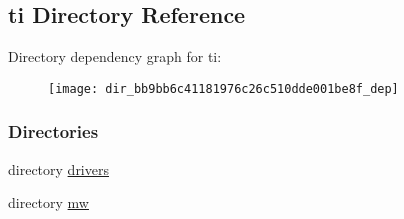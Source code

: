 \subsection{ti Directory Reference}
\label{dir_bb9bb6c41181976c26c510dde001be8f}
Directory dependency graph for ti\+:
\nopagebreak
\begin{figure}[H]
\begin{center}
\leavevmode
\texttt{[image: dir\_bb9bb6c41181976c26c510dde001be8f\_dep]}
\end{center}
\end{figure}
\subsubsection*{Directories}
\begin{DoxyCompactItemize}
\item 
directory \hyperlink{dir_3272f9f9556099c0b986cb38fa788482}{drivers}
\item 
directory \hyperlink{dir_622605b5fc87a1221dd66225202096f9}{mw}
\end{DoxyCompactItemize}
